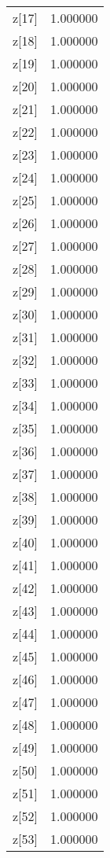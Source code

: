 \begin{longtable}{lr}
z[17] & 1.000000 \\
z[18] & 1.000000 \\
z[19] & 1.000000 \\
z[20] & 1.000000 \\
z[21] & 1.000000 \\
z[22] & 1.000000 \\
z[23] & 1.000000 \\
z[24] & 1.000000 \\
z[25] & 1.000000 \\
z[26] & 1.000000 \\
z[27] & 1.000000 \\
z[28] & 1.000000 \\
z[29] & 1.000000 \\
z[30] & 1.000000 \\
z[31] & 1.000000 \\
z[32] & 1.000000 \\
z[33] & 1.000000 \\
z[34] & 1.000000 \\
z[35] & 1.000000 \\
z[36] & 1.000000 \\
z[37] & 1.000000 \\
z[38] & 1.000000 \\
z[39] & 1.000000 \\
z[40] & 1.000000 \\
z[41] & 1.000000 \\
z[42] & 1.000000 \\
z[43] & 1.000000 \\
z[44] & 1.000000 \\
z[45] & 1.000000 \\
z[46] & 1.000000 \\
z[47] & 1.000000 \\
z[48] & 1.000000 \\
z[49] & 1.000000 \\
z[50] & 1.000000 \\
z[51] & 1.000000 \\
z[52] & 1.000000 \\
z[53] & 1.000000 \\
\end{longtable}
